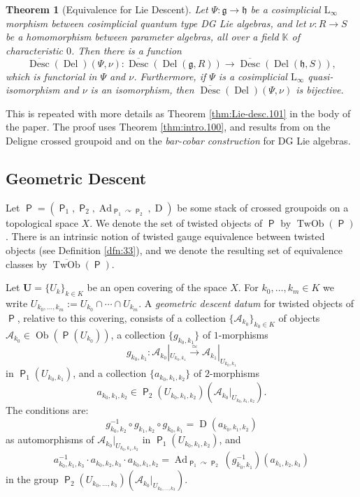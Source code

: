 \documentclass[a4paper, 10pt]{amsart}
\newtheorem{thm}[equation]{Theorem}
\theoremstyle{definition}
\numberwithin{equation}{section}
\newcommand{\iso}{\xrightarrow{\simeq}}
\newcommand{\opn}{\operatorname}
\newcommand{\cat}[1]{\operatorname{\mathsf{#1}}}
\newcommand{\ol}{\overline}
\newcommand{\mfrak}[1]{\mathfrak{#1}}
\newcommand{\mcal}[1]{\mathcal{#1}}
\newcommand{\mrm}[1]{\mathrm{#1}}
\newcommand{\mbb}[1]{\mathbb{#1}}
\newcommand{\bsym}[1]{\boldsymbol{#1}}
\newcommand{\K}{\mbb{K}}
\newcommand{\g}{\mfrak{g}}
\newcommand{\h}{\mfrak{h}}
\newcommand{\twocat}[1]{\operatorname{\bsym{\cat{#1}}}}
\newcommand{\crvar}{\curvearrowright}
\begin{document}
\begin{thm}[Equivalence for Lie Descent] \label{thm:intro.103}
Let $\Psi : \g \to \h$ be a cosimplicial $\mrm{L}_{\infty}$ morphism between 
cosimplicial quantum type DG Lie algebras, and let 
$\nu : R \to S$ be a homomorphism between parameter algebras,
all over a field $\K$ of characteristic $0$. Then there is a function 
\[ \ol{\opn{Desc}} (\opn{Del})(\Psi, \nu)  : 
\ol{\opn{Desc}} ( \opn{Del}(\g, R) ) \to 
\ol{\opn{Desc}} ( \opn{Del}(\h, S) ) , \]
which is functorial in $\Psi$ and $\nu$.
Furthermore, if $\Psi$ is a cosimplicial  $\mrm{L}_{\infty}$ quasi-isomorphism
and $\nu$ is an isomorphism, then 
$\ol{\opn{Desc}} (\opn{Del})(\Psi, \nu)$ is bijective. 
\end{thm}

This is repeated with more details as Theorem \ref{thm:Lie-desc.101} in the body
of the paper. The proof uses Theorem
\ref{thm:intro.100}, and results from \cite{Ye7} on the Deligne crossed groupoid
and on the {\em bar-cobar construction} for DG Lie algebras.



\subsection{Geometric Descent} \label{subsec:geodesc}
Let 
$\twocat{P} = ( \twocat{P}_1, \twocat{P}_2, 
\opn{Ad}_{\twocat{P}_1 \crvar \twocat{P}_{2}}, \opn{D} )$
be some stack of crossed groupoids on a topological space
$X$. We denote the set of twisted objects of $\twocat{P}$ by
$\opn{TwOb}(\twocat{P})$. 
There is an intrinsic notion of twisted gauge equivalence between 
twisted objects (see Definition \ref{dfn:33}), and we denote the resulting set
of equivalence classes by 
$\ol{\opn{TwOb}}(\twocat{P})$. 

Let $\bsym{U} = \{ U_k \}_{k \in K}$  be an open covering of the space $X$.
For $k_0, \ldots, k_m \in K$ we write 
$U_{k_0, \ldots, k_m} := U_{k_0} \cap \cdots \cap U_{k_m}$.
A {\em geometric descent datum} for twisted objects of $\twocat{P}$, relative to
this covering, consists of a collection 
$\{ \mcal{A}_{k_0} \}_{k_0 \in K}$ of objects 
$\mcal{A}_{k_0} \in \opn{Ob}(\twocat{P}(U_{k_0}))$, a collection 
$\{ g_{k_0, k_1} \}$ of $1$-morphisms
\[ g_{k_0, k_1} : \mcal{A}_{k_0}|_{U_{k_0, k_1}} \iso 
\mcal{A}_{k_1}|_{U_{k_0, k_1}} \]
in $\twocat{P}_1(U_{k_0, k_1})$, and a collection
$\{ a_{k_0, k_1, k_2} \}$ of $2$-morphisms 
\[ a_{k_0, k_1, k_2} \in 
\twocat{P}_2(U_{k_0, k_1, k_2})(\mcal{A}_{k_0}|_{U_{k_0, k_1, k_2}}) . \]
The conditions are:
\[ g_{k_0, k_2}^{-1} \circ g_{k_1, k_2} \circ g_{k_0, k_1} =
\opn{D}(a_{k_0, k_1, k_2}) \]
as automorphisms of $\mcal{A}_{k_0}|_{U_{k_0, k_1, k_2}}$
in $\twocat{P}_1(U_{k_0, k_1, k_2})$, and 
\[ a_{k_0, k_1, k_3}^{-1} \cdot a_{k_0, k_2, k_3} \cdot 
a_{k_0, k_1, k_2} = 
\opn{Ad}_{\twocat{P}_1 \crvar \twocat{P}_{2}}(g_{k_0, k_1}^{-1})
(a_{k_1, k_2, k_3}) \]
in the group
$\twocat{P}_2(U_{k_0, \ldots, k_3})
(\mcal{A}_{k_0}|_{U_{k_0, \ldots, k_3}})$.
\end{document}
